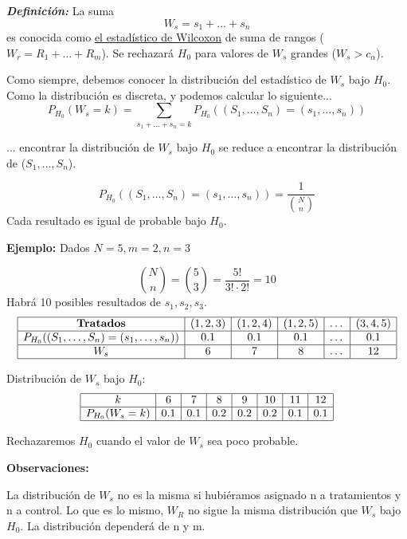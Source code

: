 \textit{\textbf{Definición: }} La suma
\[
    W_s=s_1+\dots+s_n
\]
es conocida como \href{https://es.wikipedia.org/wiki/Prueba_de_los_rangos_con_signo_de_Wilcoxon}{el estadístico de Wilcoxon} de suma de rangos ($W_r=R_1+\dots+R_m$). Se rechazará $H_0$ para valores de $W_s$ grandes ($W_s>c_\alpha$).

\newpage

Como siempre, debemos conocer la distribución del estadístico de $W_s$ bajo $H_0$. Como la distribución es discreta, y podemos calcular lo siguiente...
\[
    P_{H_0}(W_s=k)=\sum_{s_1+\dots+s_n=k} P_{H_0} ((S_1,\dots,S_n)=(s_1,\dots,s_n))
\]

... encontrar la distribución de $W_s$ bajo $H_0$ se reduce a encontrar la distribución de ($S_1,\dots,S_n$).

\[
    P_{H_0} ((S_1,\dots,S_n)=(s_1,\dots,s_n))=\frac{1}{\binom{N}{n}}
\]
Cada resultado es igual de probable bajo $H_0$.


\textbf{Ejemplo:}
\noindent Dados $N=5, m=2, n=3$

\[
    \binom{N}{n}=\binom{5}{3}=\frac{5!}{3!\cdot2!}=10
\]
Habrá 10 posibles resultados de $s_1,s_2,s_3$.
\[
    \begin{array}{|c|c|c|c|c|c|}
    \hline
    \textbf{Tratados} & (1,2,3) & (1,2,4) & (1,2,5) & \dots & (3,4,5) \\ \hline
    P_{H_0}((S_1, \dots, S_n) = (s_1, \dots, s_n)) & 0.1 & 0.1 & 0.1 & \dots & 0.1 \\ \hline
    W_s & 6 &7 &8 & \dots &12 \\ \hline
    \end{array}
\]

\noindent Distribución de \(W_s\) bajo \(H_0\):
\[
    \begin{array}{|c|c|c|c|c|c|c|c|}
    \hline
    k & 6 & 7 & 8 & 9 & 10 & 11 & 12 \\ \hline
    P_{H_0}(W_s = k) & 0.1 & 0.1 & 0.2 & 0.2 & 0.2 & 0.1 & 0.1 \\ \hline
    \end{array}
\]

\noindent Rechazaremos $H_0$ cuando el valor de $W_s$ sea poco probable.

\vspace{2mm}

\noindent \textbf{Observaciones:}

La distribución de $W_s$ no es la misma si hubiéramos asignado n a tratamientos y n a control. Lo que es lo mismo, $W_R$ no sigue la misma distribución que $W_s$ bajo $H_0$. La distribución dependerá de n y m.

